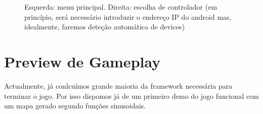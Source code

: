 \documentclass{article}
\begin{document}
\begin{figure}[H]
\caption{Esquerda: menu principal. Direita: escolha de controlador (em princípio, será necessário introduzir o endereço IP do android mas, idealmente, faremos deteção automática de devices)}
\end{figure}

\section{Preview de Gameplay}
Actualmente, já conlcuímos grande maioria da framework necessária para terminar o jogo. Por isso dispomos já de um primeiro demo do jogo funcional com um mapa gerado segundo funções sinusoidais.
\end{document}
